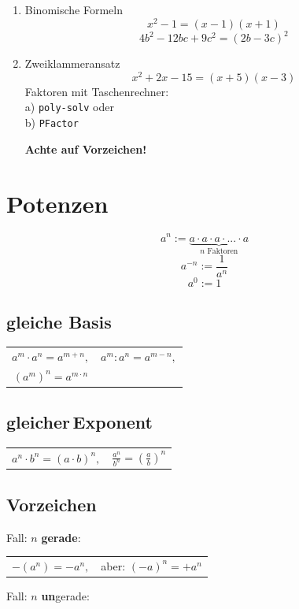 \begin{multicols}{2}
\begin{enumerate}
\item Binomische Formeln
$$x^2-1 = (x-1)(x+1)$$
$$4b^2 -12bc + 9c^2=(2b-3c)^2$$
\item Zweiklammeransatz
$$x^2+2x-15 = (x+5)(x-3)$$
Faktoren mit Taschenrechner:\\ a) \texttt{poly-solv} 
oder\\ b) \texttt{PFactor} 

\textbf{\color{red}Achte auf Vorzeichen!}
\end{enumerate}




\forceCB
\section*{Potenzen}
\begin{tcolorbox}[colback=white]
$$a^n := \underbrace{a\cdot{}a\cdot{}a\cdot{}...\cdot{}a}_{n\textrm{ Faktoren}}$$
$$a^{-n} := \frac1{a^n}$$
  $$a^0 := 1$$
\end{tcolorbox}

\subsection*{gleiche Basis}
\begin{tabular}{cc}
$a^m\cdot{}a^n = a^{m+n},$ & $a^m:a^n=a^{m-n},$ \\
$\left(a^m\right)^n = a^{m\cdot{}n}$ &
 \end{tabular} 

\subsection*{gleicher\,Exponent}
\begin{tabular}{cc}
$a^n\cdot{}b^n = (a\cdot{}b)^n,$ & $\frac{a^n}{b^n} =\left(\frac{a}b\right)^n $
 \end{tabular}

\subsection*{Vorzeichen}
Fall: $n$ \textbf{gerade}:

\begin{tabular}{cc}
 $-(a^n) = -a^n,$ & aber: $(-a)^n = +a^n$
 \end{tabular} 

Fall: $n$ \textbf{un}gerade:


\end{multicols}
